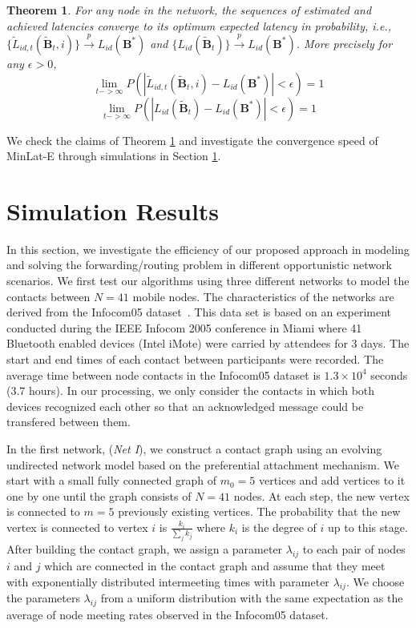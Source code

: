 \documentclass[journal,onecolumn,11pt]{IEEEtran}
\theoremstyle{plain}
\newtheorem{theorem}{Theorem}
\theoremstyle{definition}
\begin{document}
\begin{theorem}\label{theorem4}
 For any node in the network, the sequences of estimated and achieved latencies converge to its optimum expected latency in probability, i.e., $\{\widetilde{L}_{id,t}(\widetilde{\mathbf{B}}_t,i)\} \xrightarrow{p} L_{id}(\mathbf{B}^*)$ and $\{L_{id}(\widetilde{\mathbf{B}}_t)\} \xrightarrow{p} L_{id}(\mathbf{B}^*)$. More precisely for any $\epsilon >0$,
\begin{equation}
\underset{t -> \infty}{\lim} P(|\widetilde{L}_{id,t}(\widetilde{\mathbf{B}}_t,i)-L_{id}(\mathbf{B}^*)|< \epsilon)=1
\end{equation}
\begin{equation}
\underset{t -> \infty}{\lim} P(|L_{id}(\widetilde{\mathbf{B}}_t)-L_{id}(\mathbf{B}^*)|< \epsilon)=1
\end{equation}
\end{theorem}
 We check the claims of Theorem \ref{theorem4} and investigate the
 convergence speed of MinLat-E through simulations in Section
\ref{sec:res}. 

\section{Simulation Results}\label{sec:res} 
In this section, we investigate the efficiency of our
proposed approach in modeling and solving the forwarding/routing problem in
different opportunistic network scenarios. 
We first test our algorithms using three different
networks to model the contacts between $N=41$ mobile nodes.
The characteristics of the networks are derived from the Infocom05 dataset~\cite{cambridge-haggle-2006-01-31}. This data set is based on an
experiment conducted during the IEEE Infocom 2005 conference in Miami
where 41 Bluetooth enabled devices (Intel iMote) were carried by
attendees for 3 days. The start and end times of each contact
between participants were recorded.  The average time between node
contacts in the Infocom05 dataset is $1.3 \times 10^4$ seconds ($3.7$
hours). In our processing, we only consider the contacts in which both devices
recognized each other so that an acknowledged message could be
transfered between them. 

In the first network, ({\em Net I}), we construct a contact graph using
an evolving undirected network model based on the preferential
attachment mechanism. We start with a small fully connected graph of
$m_0 = 5$ vertices and add vertices to it one by one until the
graph consists of $N=41$ nodes. At each step, the new vertex is
connected to $m=5$ previously existing vertices. The probability
that the new vertex is connected to vertex $i$ is $\frac{k_i}{\sum_j
  k_j}$ where $k_i$ is the degree of $i$ up to this stage. After
building the contact graph, we assign a parameter $\lambda_{ij}$ to
each pair of nodes $i$ and $j$ which are connected in the contact
graph and assume that they meet with exponentially distributed
intermeeting times with parameter $\lambda_{ij }$. We choose the parameters $\lambda_{ij}$ from a uniform distribution with the same expectation as the average of node meeting rates observed in the Infocom05 dataset. 
\end{document}
